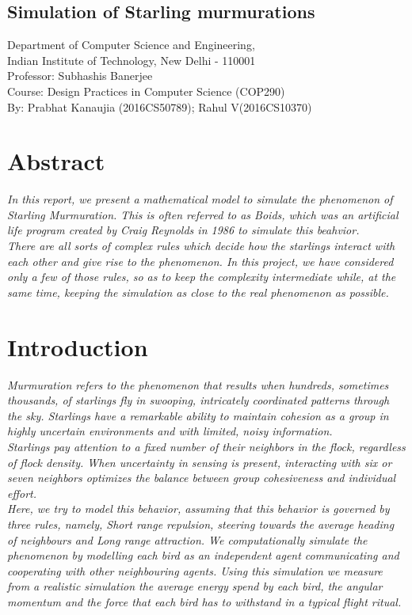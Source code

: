 \documentclass[a4paper,12pt]{article}
\begin{document}
\begin{center}
\section*{Simulation of Starling murmurations}

Department of Computer Science and Engineering,\\
Indian Institute of Technology, New Delhi - 110001\\
Professor: Subhashis Banerjee\\
Course: Design Practices in Computer Science (COP290)\\

By: Prabhat Kanaujia (2016CS50789); Rahul V(2016CS10370)\\
\end{center}

\section{Abstract}
\emph{
In this report, we present a mathematical model to simulate the phenomenon of Starling Murmuration. This is often referred to as Boids, which was an artificial life program created by Craig Reynolds in 1986 to simulate this beahvior.
}\\
\emph{
There are all sorts of complex rules which decide how the starlings interact with each other and give rise to the phenomenon. In this project, we have considered only a few of those rules, so as to keep the complexity intermediate while, at the same time, keeping the simulation as close to the real phenomenon as possible.
}
\\
\section{Introduction}
\emph{
Murmuration refers to the phenomenon that results when hundreds, sometimes thousands, of starlings fly in swooping, intricately coordinated patterns through the sky. Starlings have a remarkable ability to maintain cohesion as a group in highly uncertain environments and with limited, noisy information.
}
\\
\emph{
Starlings pay attention to a fixed number of their neighbors in the flock, regardless of flock density. When uncertainty in sensing is present, interacting with six or seven neighbors optimizes the balance between group cohesiveness and individual effort. 
}
\\
\emph{
Here, we try to model this behavior, assuming that this behavior is governed by three rules, namely, Short range repulsion, steering towards the average heading of neighbours and Long range attraction. We computationally simulate the phenomenon by modelling each bird as an independent agent communicating and cooperating with other neighbouring agents. Using this simulation we measure from a realistic simulation the average energy spend by each bird, the angular momentum and the force that each bird has to withstand in a typical flight ritual.
}
\end{document}
